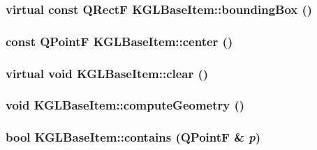 \hypertarget{class_k_g_l_base_item_b0b84c51ad212eae0873afa956ace7cf}{
\subsubsection[{boundingBox}]{\setlength{\rightskip}{0pt plus 5cm}virtual const QRectF KGLBaseItem::boundingBox ()}}
\label{class_k_g_l_base_item_b0b84c51ad212eae0873afa956ace7cf}


\hypertarget{class_k_g_l_base_item_756267078e458ee97974bc610ff332b1}{
\subsubsection[{center}]{\setlength{\rightskip}{0pt plus 5cm}const QPointF KGLBaseItem::center ()}}
\label{class_k_g_l_base_item_756267078e458ee97974bc610ff332b1}


\hypertarget{class_k_g_l_base_item_b84b10f4cbeeb352cf91f327a564b377}{
\subsubsection[{clear}]{\setlength{\rightskip}{0pt plus 5cm}virtual void KGLBaseItem::clear ()}}
\label{class_k_g_l_base_item_b84b10f4cbeeb352cf91f327a564b377}


\hypertarget{class_k_g_l_base_item_4fb2662f683c8d710039f229583c8c1c}{
\subsubsection[{computeGeometry}]{\setlength{\rightskip}{0pt plus 5cm}void KGLBaseItem::computeGeometry ()}}
\label{class_k_g_l_base_item_4fb2662f683c8d710039f229583c8c1c}


\hypertarget{class_k_g_l_base_item_d69c3373e2bc0d47881dff95456c1bbc}{
\subsubsection[{contains}]{\setlength{\rightskip}{0pt plus 5cm}bool KGLBaseItem::contains (QPointF \& {\em p})}}
\label{class_k_g_l_base_item_d69c3373e2bc0d47881dff95456c1bbc}


